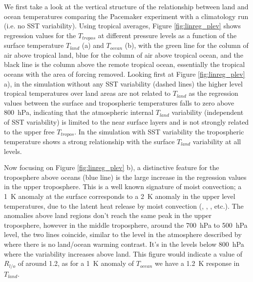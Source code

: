 We first take a look at the vertical structure of the relationship between land 
and ocean temperatures comparing the Pacemaker experiment with a climatology run 
(i.e. no SST variability).  Using tropical averages, Figure 
\ref{fig:linreg_plev} shows regression values for the $T_{tropos}$ at different 
pressure levels as a function of the surface temperature $T_{land}$ (a) and 
$T_{ocean}$ (b), with the green line for the column of air above tropical land, 
blue for the column of air above tropical ocean, and the black line is the 
column above the remote tropical ocean, essentially the tropical oceans with the 
area of forcing removed.  Looking first at Figure \ref{fig:linreg_plev} a), in 
the simulation without any SST variability (dashed lines) the higher level 
tropical temperatures over land areas are not related to $T_{land}$ as the 
regression values between the surface and tropospheric temperatures falls to 
zero above \SI{800}{\hecto\pascal}, indicating that the atmospheric internal 
$T_{land}$ variability (independent of SST variability) is limited to the near 
surface layers and is not strongly related to the upper free $T_{tropos}$. In 
the simulation with SST variability the tropospheric temperature shows a strong 
relationship with the surface $T_{land}$ variability at all levels. 

Now focusing on Figure \ref{fig:linreg_plev} b), a distinctive feature for the 
troposphere above oceans (blue line) is the large increase in the regression 
values in the upper troposphere. This is a well known signature of moist
convection; a \SI{1}{\kelvin} anomaly at the surface corresponds to a 
\SI{2}{\kelvin} anomaly in the upper level temperatures, due to the latent heat 
release by moist convection (\citet{Joshi2007}, \citet{Byrne2013}, 
\citet{Dommenget2009}, etc.). The anomalies above land regions don't reach the 
same peak in the upper troposphere, however in the middle troposphere, around 
the \SI{700}{\hecto\pascal} to \SI{500}{\hecto\pascal} level, the two lines 
coincide, similar to the level in the atmosphere described by \citet{Joshi2007} 
where there is no land/ocean warming contrast. It's in the levels below 
\SI{800}{\hecto\pascal} where the variability increases above land. This figure 
would indicate a value of $R_{l/o}$ of around 1.2, as for a \SI{1}{\kelvin} 
anomaly of $T_{ocean}$ we have a \SI{1.2}{\kelvin} response in $T_{land}$.  


